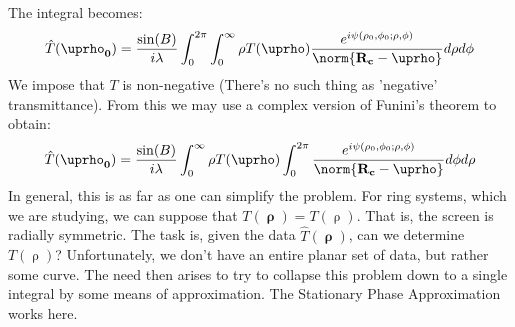 \documentclass[crop=false,class=book,oneside]{standalone}
\begin{document}
            The integral becomes:
            \begin{equation}
                \hat{T}(\boldsymbol{\uprho_{0}})
                =\frac{\sin(B)}{i\lambda}
                 \int_{0}^{2\pi}\int_{0}^{\infty}\rho
                 T(\boldsymbol{\uprho})
                 \frac{%
                    e^{i\psi(\rho_{0},\phi_{0};\rho,\phi)}
                }{%
                    \norm{\mathbf{R_{c}}-\boldsymbol{\uprho}}
                }d\rho{d}\phi    
            \end{equation}
            We impose that $T$ is non-negative
            (There's no such thing as 'negative' transmittance).
            From this we may use a complex version of Funini's
            theorem to obtain:
            \begin{equation}
                \hat{T}(\boldsymbol{\uprho_{0}})
                =\frac{\sin(B)}{i\lambda}\int_{0}^{\infty}\rho T(\boldsymbol{\uprho})\int_{0}^{2\pi}\frac{e^{i\psi(\rho_{0},\phi_{0};\rho,\phi)}}{\norm{\mathbf{R_{c}}-\boldsymbol{\uprho}}}d\phi d\rho
            \end{equation}
                In general, this is as far as one can simplify the problem. For ring systems, which we are studying, we can suppose that $T(\boldsymbol{\uprho})=T(\uprho)$. That is, the screen is radially symmetric. The task is, given the data $\hat{T}(\boldsymbol{\uprho})$, can we determine $T(\uprho)$? Unfortunately, we don't have an entire planar set of data, but rather some curve. The need then arises to try to collapse this problem down to a single integral by some means of approximation. The Stationary Phase Approximation works here.
\end{document}
